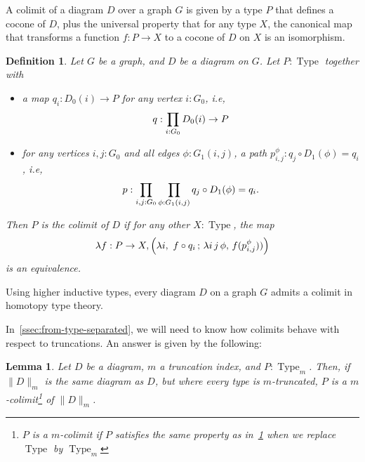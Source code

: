 \documentclass[preprint,9pt,numbers]{sigplanconf}
\newtheorem{defi}[thm]{Definition}
\newtheorem{lem}[thm]{Lemma}
\newcommand{\ie}{i.e,\xspace}
\DeclareMathOperator{\Type}{Type}
\DeclareMathOperator{\precompose}{\mathrm{precompose}}
\newcommand \colim[1] {\mathrm{colim}(Q)}
\newenvironment{mymath}[1][-0em]{%
  \newcommand\mymathaux{\vspace{#1}}%
  \vspace{#1}%
  \begin{equation*}%
  }{ %
    \mymathaux%
  \end{equation*}}
\begin{document}
A colimit of a diagram $D$ over a graph $G$ is given by a type $P$
that defines a cocone of $D$, plus the universal property that for any
type $X$, the canonical map that transforms a function $f : P
\rightarrow X$ to a cocone of $D$ on $X$ is an isomorphism.
% 
\begin{defi}\label{def:colimit}
Let $G$ be a graph, and $D$ be a diagram on $G$. 
Let $P:\Type$ together with
\begin{itemize}
\item a map $q_i : D_0(i) \to P$ for any
vertex $i:G_0$, \ie \begin{mymath}[0em]q : \prod_{i:G_0} D_0(i) \to P\end{mymath}%
\item for any vertices $i,j:G_0$ and all edges $\phi:G_1(i,j)$, a path
  $p_{i,j}^\phi : q_j \circ D_1(\phi) = q_i$, \ie
  \begin{mymath}[0em]p : \prod_{i,j:G_0} \prod_{\phi:G_1(i,j)} q_j \circ D_1(\phi) = q_i.\end{mymath}%
\end{itemize}

Then $P$ is the {\em colimit} of $D$ if for any other $X:\Type$, the
map
\begin{mymath}\lambda f:P \to X, \left( \lambda i,~f \circ q_i\, ;\, \lambda i\, j\,
  \phi,\, f (p_{i, j}^\phi)) \right)\end{mymath}%
is an equivalence.
\end{defi}
Using higher inductive types, every diagram $D$ on a graph $G$ admits a
colimit in homotopy type theory. 

In~\ref{ssec:from-type-separated}, we will need to know how colimits
behave with respect to truncations. An answer is given by the following:

\begin{lem}
  Let $D$ be a diagram, $m$ a truncation index, and
  $P:\Type_{m}$. 
  Then, if $\|D\|_m$ is the same diagram as $D$, but where every type
  is $m$-truncated, $P$ is a $m$-colimit\footnote{$P$ is a $m$-colimit
    if $P$ satisfies the same property as in~\ref{def:colimit} when
    we replace $\Type$ by $\Type_m$} of $\|D\|_m$.
\end{lem}


\end{document}
